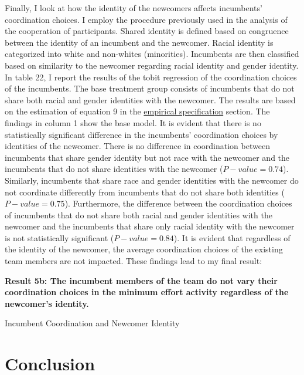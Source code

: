 \hspace  *{0mm} Finally, I look at how the identity of the newcomers affects incumbents’ coordination choices. I employ the procedure previously used in the analysis of the cooperation of participants. Shared identity is defined based on congruence between the identity of an incumbent and the newcomer. Racial identity is categorized into white and non-whites (minorities). Incumbents are then classified based on similarity to the newcomer regarding racial identity and gender identity. In table 22, I report the results of the tobit regression of the coordination choices of the incumbents. The base treatment group consists of incumbents that do not share both racial and gender identities with the newcomer. The results are based on the estimation of equation 9 in the \hyperref[subsec:Specification]{empirical specification} section. The findings in column 1 show the base model. It is evident that there is no statistically significant difference in the incumbents’ coordination choices by identities of the newcomer. There is no difference in coordination between incumbents that share gender identity but not race with the newcomer and the incumbents that do not share identities with the newcomer ($P-value=0.74$). Similarly, incumbents that share race and gender identities with the newcomer do not coordinate differently from incumbents that do not share both identities ($P-value=0.75$). Furthermore, the difference between the coordination choices of incumbents that do not share both racial and gender identities with the newcomer and the incumbents that share only racial identity with the newcomer is not statistically significant ($P-value=0.84$). It is evident that regardless of the identity of the newcomer, the average coordination choices of the existing team members are not impacted. These findings lead to my final result: 

\textbf{Result 5b: The incumbent members of the team do not vary their coordination choices in the minimum effort activity regardless of the newcomer's identity.}

\begin{table}[H]
 \captionsetup{justification=raggedright,singlelinecheck=false}
\caption{ Incumbent Coordination and Newcomer Identity } \label{tab:table12}
    \begin{center}
        
    \end{center}
\end{table}

\section{Conclusion} \label{sec:Conclusion}

